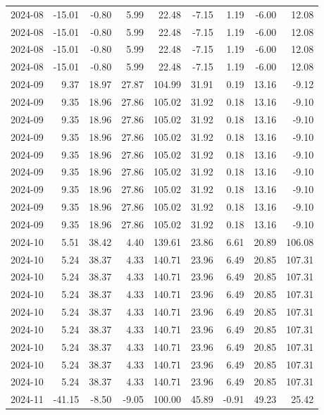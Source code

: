 \begin{table}[ht]
\begin{tabular}{lrrrrrrrr}
  2024-08 & -15.01 & -0.80 & 5.99 & 22.48 & -7.15 & 1.19 & -6.00 & 12.08 \\ 
  2024-08 & -15.01 & -0.80 & 5.99 & 22.48 & -7.15 & 1.19 & -6.00 & 12.08 \\ 
  2024-08 & -15.01 & -0.80 & 5.99 & 22.48 & -7.15 & 1.19 & -6.00 & 12.08 \\ 
  2024-08 & -15.01 & -0.80 & 5.99 & 22.48 & -7.15 & 1.19 & -6.00 & 12.08 \\ 
  2024-09 & 9.37 & 18.97 & 27.87 & 104.99 & 31.91 & 0.19 & 13.16 & -9.12 \\ 
  2024-09 & 9.35 & 18.96 & 27.86 & 105.02 & 31.92 & 0.18 & 13.16 & -9.10 \\ 
  2024-09 & 9.35 & 18.96 & 27.86 & 105.02 & 31.92 & 0.18 & 13.16 & -9.10 \\ 
  2024-09 & 9.35 & 18.96 & 27.86 & 105.02 & 31.92 & 0.18 & 13.16 & -9.10 \\ 
  2024-09 & 9.35 & 18.96 & 27.86 & 105.02 & 31.92 & 0.18 & 13.16 & -9.10 \\ 
  2024-09 & 9.35 & 18.96 & 27.86 & 105.02 & 31.92 & 0.18 & 13.16 & -9.10 \\ 
  2024-09 & 9.35 & 18.96 & 27.86 & 105.02 & 31.92 & 0.18 & 13.16 & -9.10 \\ 
  2024-09 & 9.35 & 18.96 & 27.86 & 105.02 & 31.92 & 0.18 & 13.16 & -9.10 \\ 
  2024-09 & 9.35 & 18.96 & 27.86 & 105.02 & 31.92 & 0.18 & 13.16 & -9.10 \\ 
  2024-10 & 5.51 & 38.42 & 4.40 & 139.61 & 23.86 & 6.61 & 20.89 & 106.08 \\ 
  2024-10 & 5.24 & 38.37 & 4.33 & 140.71 & 23.96 & 6.49 & 20.85 & 107.31 \\ 
  2024-10 & 5.24 & 38.37 & 4.33 & 140.71 & 23.96 & 6.49 & 20.85 & 107.31 \\ 
  2024-10 & 5.24 & 38.37 & 4.33 & 140.71 & 23.96 & 6.49 & 20.85 & 107.31 \\ 
  2024-10 & 5.24 & 38.37 & 4.33 & 140.71 & 23.96 & 6.49 & 20.85 & 107.31 \\ 
  2024-10 & 5.24 & 38.37 & 4.33 & 140.71 & 23.96 & 6.49 & 20.85 & 107.31 \\ 
  2024-10 & 5.24 & 38.37 & 4.33 & 140.71 & 23.96 & 6.49 & 20.85 & 107.31 \\ 
  2024-10 & 5.24 & 38.37 & 4.33 & 140.71 & 23.96 & 6.49 & 20.85 & 107.31 \\ 
  2024-10 & 5.24 & 38.37 & 4.33 & 140.71 & 23.96 & 6.49 & 20.85 & 107.31 \\ 
  2024-11 & -41.15 & -8.50 & -9.05 & 100.00 & 45.89 & -0.91 & 49.23 & 25.42 \\ 

\end{tabular}
\end{table}

